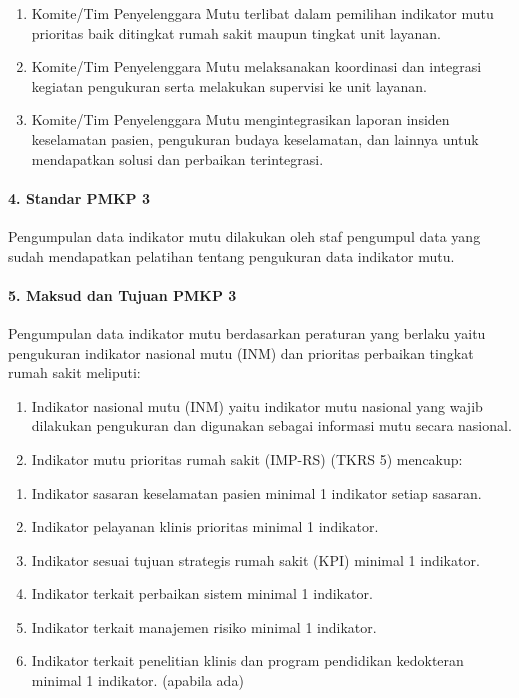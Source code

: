 \documentclass[
]{book}
\providecommand{\tightlist}{%
  \setlength{\itemsep}{0pt}\setlength{\parskip}{0pt}}
\begin{document}
\begin{enumerate}
\def\labelenumi{\alph{enumi}.}
\tightlist
\item
  Komite/Tim Penyelenggara Mutu terlibat dalam pemilihan indikator mutu prioritas baik ditingkat rumah sakit maupun tingkat unit layanan.
\item
  Komite/Tim Penyelenggara Mutu melaksanakan koordinasi dan integrasi kegiatan pengukuran serta melakukan supervisi ke unit layanan.
\item
  Komite/Tim Penyelenggara Mutu mengintegrasikan laporan insiden keselamatan pasien, pengukuran budaya keselamatan, dan lainnya untuk mendapatkan solusi dan perbaikan terintegrasi.
\end{enumerate}

\hypertarget{standar-pmkp-3}{%
\paragraph*{4. Standar PMKP 3}\label{standar-pmkp-3}}

Pengumpulan data indikator mutu dilakukan oleh staf pengumpul data yang sudah mendapatkan pelatihan tentang pengukuran data indikator mutu.

\hypertarget{maksud-dan-tujuan-pmkp-3}{%
\paragraph*{5. Maksud dan Tujuan PMKP 3}\label{maksud-dan-tujuan-pmkp-3}}

Pengumpulan data indikator mutu berdasarkan peraturan yang berlaku yaitu pengukuran indikator nasional mutu (INM) dan prioritas perbaikan tingkat rumah sakit meliputi:

\begin{enumerate}
\def\labelenumi{\alph{enumi}.}
\tightlist
\item
  Indikator nasional mutu (INM) yaitu indikator mutu nasional yang wajib dilakukan pengukuran dan digunakan sebagai informasi mutu secara nasional.
\item
  Indikator mutu prioritas rumah sakit (IMP-RS) (TKRS 5) mencakup:
\end{enumerate}

\begin{enumerate}
\def\labelenumi{\arabic{enumi}.}
\tightlist
\item
  Indikator sasaran keselamatan pasien minimal 1 indikator setiap sasaran.
\item
  Indikator pelayanan klinis prioritas minimal 1 indikator.
\item
  Indikator sesuai tujuan strategis rumah sakit (KPI) minimal 1 indikator.
\item
  Indikator terkait perbaikan sistem minimal 1 indikator.
\item
  Indikator terkait manajemen risiko minimal 1 indikator.
\item
  Indikator terkait penelitian klinis dan program pendidikan kedokteran minimal 1 indikator. (apabila ada)
\end{enumerate}
\end{document}
